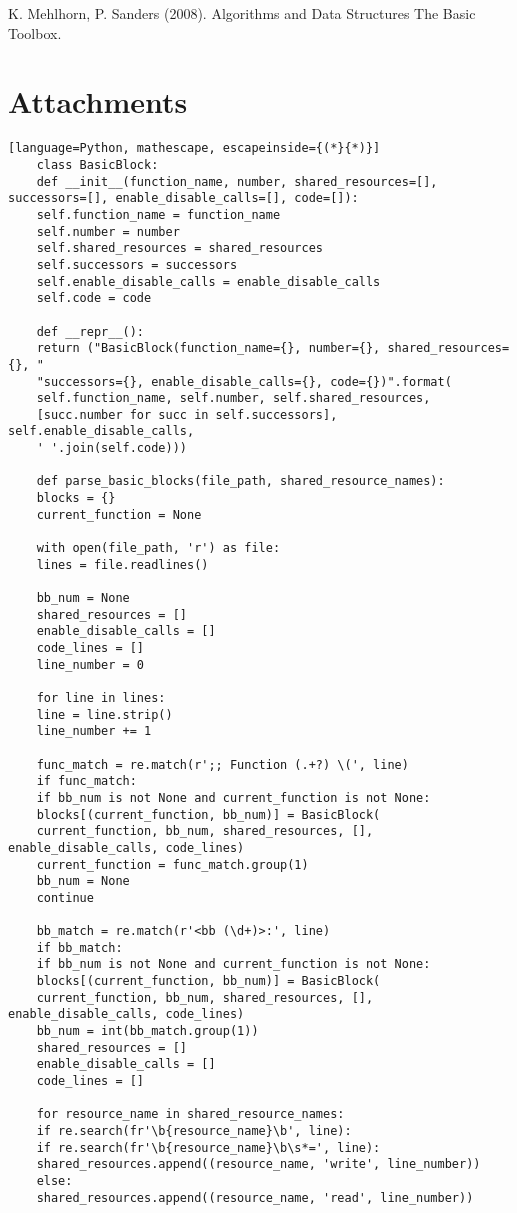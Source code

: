 \documentclass[
fancyheadings, %
%
%
]{stsreprt}
\begin{document}
{\begin{thebibliography}{9}
	K. Mehlhorn, P. Sanders (2008). Algorithms and Data Structures The Basic Toolbox.
\end{thebibliography}
\chapter{Attachments}
\begin{lstlisting}[language=Python, mathescape, escapeinside={(*}{*)}]
	class BasicBlock:
	def __init__(function_name, number, shared_resources=[], successors=[], enable_disable_calls=[], code=[]):
	self.function_name = function_name
	self.number = number
	self.shared_resources = shared_resources
	self.successors = successors
	self.enable_disable_calls = enable_disable_calls
	self.code = code
	
	def __repr__():
	return ("BasicBlock(function_name={}, number={}, shared_resources={}, "
	"successors={}, enable_disable_calls={}, code={})".format(
	self.function_name, self.number, self.shared_resources, 
	[succ.number for succ in self.successors], self.enable_disable_calls, 
	' '.join(self.code)))
	
	def parse_basic_blocks(file_path, shared_resource_names):
	blocks = {}
	current_function = None
	
	with open(file_path, 'r') as file:
	lines = file.readlines()
	
	bb_num = None
	shared_resources = []
	enable_disable_calls = []
	code_lines = []
	line_number = 0  
	
	for line in lines:
	line = line.strip()
	line_number += 1
	
	func_match = re.match(r';; Function (.+?) \(', line)
	if func_match:
	if bb_num is not None and current_function is not None:
	blocks[(current_function, bb_num)] = BasicBlock(
	current_function, bb_num, shared_resources, [], enable_disable_calls, code_lines)
	current_function = func_match.group(1)
	bb_num = None
	continue
	
	bb_match = re.match(r'<bb (\d+)>:', line)
	if bb_match:
	if bb_num is not None and current_function is not None:
	blocks[(current_function, bb_num)] = BasicBlock(
	current_function, bb_num, shared_resources, [], enable_disable_calls, code_lines)
	bb_num = int(bb_match.group(1))
	shared_resources = []
	enable_disable_calls = []
	code_lines = []
	
	for resource_name in shared_resource_names:
	if re.search(fr'\b{resource_name}\b', line):
	if re.search(fr'\b{resource_name}\b\s*=', line):
	shared_resources.append((resource_name, 'write', line_number))
	else:
	shared_resources.append((resource_name, 'read', line_number))
	

\end{lstlisting}}
\end{document}
